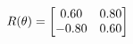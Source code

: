 \documentclass[preview]{standalone}
\begin{document}
\begin{align*}
\special{dvisvgm:raw <g id='unique000'>}R(\theta) = \begin{bmatrix}0.60 & 0.80\\-0.80 & 0.60\end{bmatrix}\special{dvisvgm:raw </g>}
\end{align*}
\end{document}
